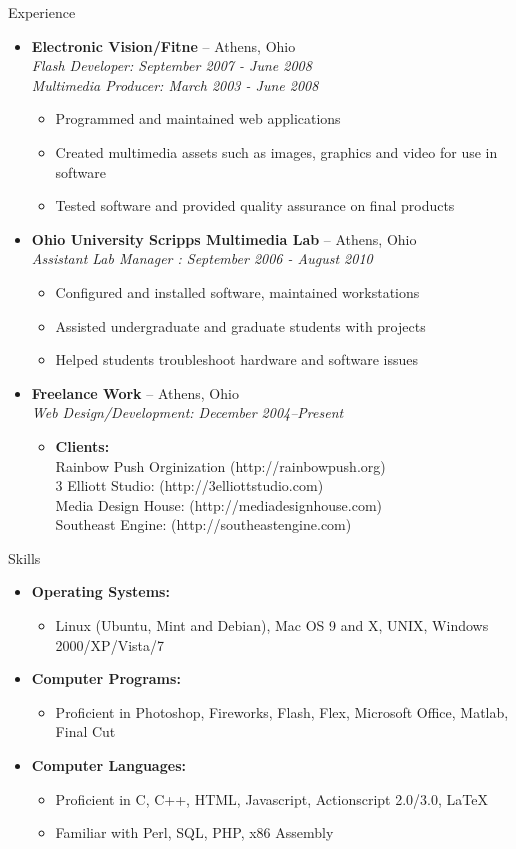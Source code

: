 \documentclass[11pt,oneside]{article}
\newenvironment{ressection}[1]{
	\vspace{4pt}
	{\fontfamily{phv}\selectfont\Large#1}
	\begin{itemize}
	\vspace{3pt}
}{
	\end{itemize}
}
\newcommand{\resitem}[1]{
	\vspace{-4pt}
	\item \begin{flushleft} #1 \end{flushleft}
}
\newcommand{\ressubitem}[1]{
	\vspace{-1pt}
	\item \begin{flushleft} #1 \end{flushleft}
}
\newcommand{\resbigitem}[3]{
	\vspace{-8pt}
	\item
	\textbf{#1} -- #2 \\
	\textit{#3}
}
\newenvironment{ressubsec}[3]{
	\resbigitem{#1}{#2}{#3}
	\vspace{-5pt}
	\begin{itemize}
}{
	\end{itemize}
}
\newenvironment{reslist}[1]{
	\resitem{\textbf{#1}}
	\vspace{-5pt}
	\begin{itemize}
}{
	\end{itemize}
}
\begin{document}
\begin{ressection}{Experience}

	\begin{ressubsec}{Electronic Vision/Fitne}{Athens, Ohio}{Flash Developer: September 2007 - June 2008\\Multimedia Producer: March 2003 - June 2008}
		\ressubitem{Programmed and maintained web applications}
		\ressubitem{Created multimedia assets such as images, graphics and video for use in software}
		\ressubitem{Tested software and provided quality assurance on final products }
	\end{ressubsec}

	\begin{ressubsec}{Ohio University Scripps Multimedia Lab}{Athens, Ohio}{Assistant Lab Manager : September 2006 - August 2010}
		\ressubitem{Configured and installed software, maintained workstations}
		\ressubitem{Assisted undergraduate and graduate students with projects}
		\ressubitem{Helped students troubleshoot hardware and software issues}
	\end{ressubsec}

	\begin{ressubsec}{Freelance Work}{Athens, Ohio}{Web Design/Development: December 2004--Present}
	\ressubitem{\textbf{Clients:}\\
	Rainbow Push Orginization (http://rainbowpush.org)\\
	3 Elliott Studio: (http://3elliottstudio.com)\\
	Media Design House: (http://mediadesignhouse.com)\\
	Southeast Engine: (http://southeastengine.com)
	}
	\end{ressubsec}



\end{ressection}


\begin{ressection}{Skills}

	\begin{reslist}{Operating Systems:} 
		\ressubitem{Linux (Ubuntu, Mint and Debian), Mac OS 9 and X, UNIX, Windows 2000/XP/Vista/7}
\end{reslist}
	\begin{reslist}{Computer Programs:} 
		\ressubitem{Proficient in Photoshop, Fireworks, Flash, Flex, Microsoft Office, Matlab, Final Cut}
	\end{reslist}	

	\begin{reslist}{Computer Languages:}

		\ressubitem{Proficient in C, C++, HTML, Javascript, Actionscript 2.0/3.0, \LaTeX}
		\ressubitem{Familiar with Perl, SQL, PHP, x86 Assembly}

	\end{reslist}

\end{ressection}
\end{document}
